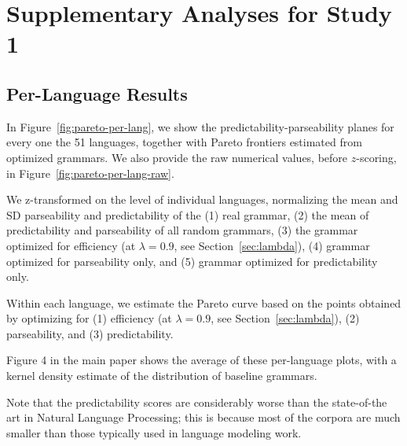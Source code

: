 \documentclass[10pt,twoside,lineno]{article}
\begin{document}
\section{Supplementary Analyses for Study 1}

\subsection{Per-Language Results}
In Figure~\ref{fig:pareto-per-lang}, we show the predictability-parseability planes for every one the 51 languages, together with Pareto frontiers estimated from optimized grammars.
We also provide the raw numerical values, before $z$-scoring, in Figure~\ref{fig:pareto-per-lang-raw}.


We z-transformed on the level of individual languages, normalizing the mean and SD parseability and predictability of the (1) real grammar, (2) the mean of predictability and parseability of all random grammars, (3) the grammar optimized for efficiency (at $\lambda =0.9$, see Section~\ref{sec:lambda}), (4) grammar optimized for parseability only, and (5) grammar optimized for predictability only.

Within each language, we estimate the Pareto curve based on the points obtained by optimizing for (1) efficiency (at $\lambda = 0.9$, see Section~\ref{sec:lambda}), (2) parseability, and (3) predictability.

Figure 4 in the main paper shows the average of these per-language plots, with a kernel density estimate of the distribution of baseline grammars. 



Note that the predictability scores are considerably worse than the state-of-the art in Natural Language Processing; this is because most of the corpora are much smaller than those typically used in language modeling work.
\end{document}
